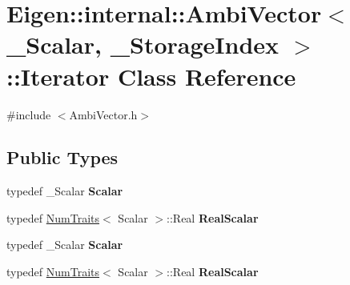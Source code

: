 \hypertarget{class_eigen_1_1internal_1_1_ambi_vector_1_1_iterator}{}\section{Eigen\+:\+:internal\+:\+:Ambi\+Vector$<$ \+\_\+\+Scalar, \+\_\+\+Storage\+Index $>$\+:\+:Iterator Class Reference}
\label{class_eigen_1_1internal_1_1_ambi_vector_1_1_iterator}


{\ttfamily \#include $<$Ambi\+Vector.\+h$>$}

\subsection*{Public Types}
\begin{DoxyCompactItemize}
\item 
\mbox{\label{class_eigen_1_1internal_1_1_ambi_vector_1_1_iterator_a4b9558b98ec8e7e2f70550d848bba83e}} 
typedef \+\_\+\+Scalar {\bfseries Scalar}
\item 
\mbox{\label{class_eigen_1_1internal_1_1_ambi_vector_1_1_iterator_afadc74f988834ec6abc9a96e00cce8bd}} 
typedef \hyperlink{group___core___module_struct_eigen_1_1_num_traits}{Num\+Traits}$<$ Scalar $>$\+::Real {\bfseries Real\+Scalar}
\item 
\mbox{\label{class_eigen_1_1internal_1_1_ambi_vector_1_1_iterator_a4b9558b98ec8e7e2f70550d848bba83e}} 
typedef \+\_\+\+Scalar {\bfseries Scalar}
\item 
\mbox{\label{class_eigen_1_1internal_1_1_ambi_vector_1_1_iterator_afadc74f988834ec6abc9a96e00cce8bd}} 
typedef \hyperlink{group___core___module_struct_eigen_1_1_num_traits}{Num\+Traits}$<$ Scalar $>$\+::Real {\bfseries Real\+Scalar}
\end{DoxyCompactItemize}
